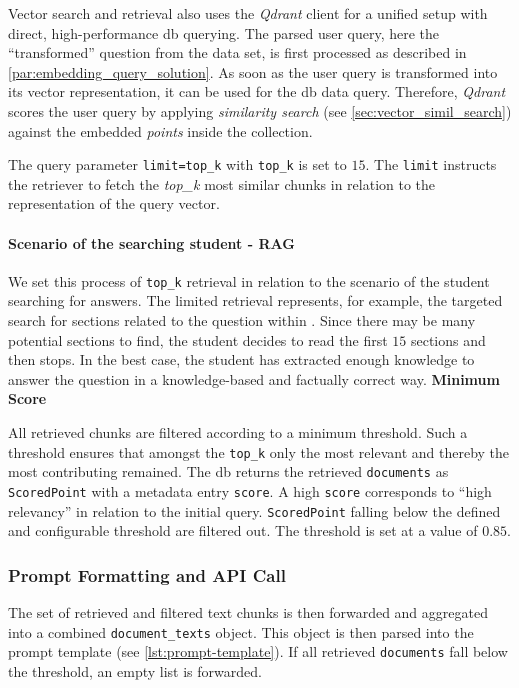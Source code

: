 Vector search and retrieval also uses the \textit{Qdrant} client for a unified setup with direct, high-performance \ac{db} querying.
The parsed user query, here the \enquote{transformed} question from the data set, is first processed as described in \cref{par:embedding_query_solution}.
%
As soon as the user query is transformed into its vector representation, it can be used for the \ac{db} data query.
Therefore, \textit{Qdrant} scores the user query by applying \textit{similarity search} (see \cref{sec:vector_simil_search}) against the embedded \textit{points} inside the collection.

The query parameter \texttt{limit=top\_k} with \texttt{top\_k} is set to $15$.
The \texttt{limit} instructs the retriever to fetch the \textit{top\_k} most similar chunks in relation to the representation of the query vector.
%
\paragraph{Scenario of the searching student - RAG}
We set this process of \texttt{top\_k} retrieval in relation to the scenario of the student searching for answers.
The limited retrieval represents, for example, the targeted search for sections related to the question within \citet{bb2}.
Since there may be many potential sections to find, the student decides to read the first $15$ sections and then stops.
In the best case, the student has extracted enough knowledge to answer the question in a knowledge-based and factually correct way.
%
\noindent \textbf{Minimum Score}

All retrieved chunks are filtered according to a minimum threshold.
Such a threshold ensures that amongst the \texttt{top\_k} only the most relevant and thereby the most contributing remained.
The \ac{db} returns the retrieved \texttt{documents} as \texttt{ScoredPoint} with a metadata entry \texttt{score}.
A high \texttt{score} corresponds to \enquote{high relevancy} in relation to the initial query.
\texttt{ScoredPoint} falling below the defined and configurable threshold are filtered out.
The threshold is set at a value of $0.85$.
%
\subsubsection{Prompt Formatting and API Call}\label{sub:prompt_api_rag}

The set of retrieved and filtered text chunks is then forwarded and aggregated into a combined \texttt{document\_texts} object.
This object is then parsed into the prompt template (see \cref{lst:prompt-template}).
If all retrieved \texttt{documents} fall below the threshold, an empty list is forwarded.

